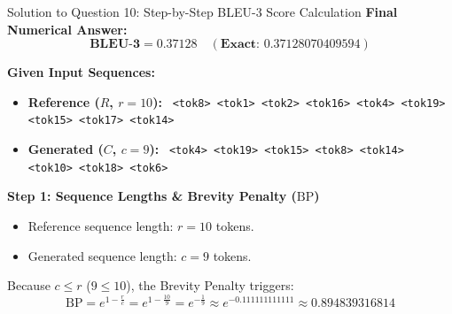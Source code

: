 \documentclass[11pt,a4paper]{article}
\begin{document}
\begin{solutionbox}{Solution to Question 10: Step-by-Step BLEU-3 Score Calculation}
\textbf{Final Numerical Answer:}
\begin{equation*}
    \mathbf{\text{BLEU-3} = 0.37128 \quad (\text{Exact: } 0.37128070409594)}
\end{equation*}

\medskip
\noindent
\textbf{Given Input Sequences:}
\begin{itemize}[leftmargin=1.5em, itemsep=2pt]
    \item \textbf{Reference ($R$, $r=10$):} \texttt{ <tok8> <tok1> <tok2> <tok16> <tok4> <tok19> <tok15> <tok17> <tok14>}
    \item \textbf{Generated ($C$, $c=9$):} \texttt{ <tok4> <tok19> <tok15> <tok8> <tok14> <tok10> <tok18> <tok6>}
\end{itemize}

\medskip
\noindent
\textbf{Step 1: Sequence Lengths \& Brevity Penalty ($\text{BP}$)}
\begin{itemize}[leftmargin=1.5em]
    \item Reference sequence length: $r = 10$ tokens.
    \item Generated sequence length: $c = 9$ tokens.
\end{itemize}
Because $c \le r$ ($9 \le 10$), the Brevity Penalty triggers:
\begin{equation*}
    \text{BP} = e^{1 - \frac{r}{c}} = e^{1 - \frac{10}{9}} = e^{-\frac{1}{9}} \approx e^{-0.111111111111} \approx \mathbf{0.894839316814}
\end{equation*}


\end{solutionbox}
\end{document}
